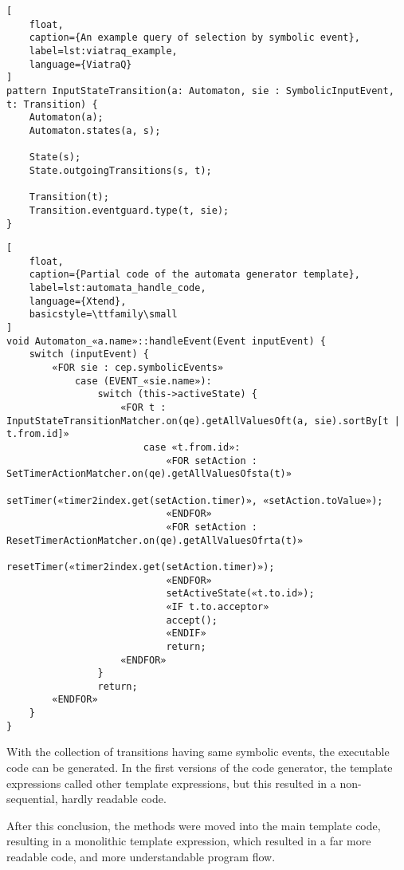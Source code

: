 \begin{lstlisting}[
	float,
	caption={An example query of selection by symbolic event},
	label=lst:viatraq_example,
	language={ViatraQ}
]
pattern InputStateTransition(a: Automaton, sie : SymbolicInputEvent, t: Transition) {
	Automaton(a);
	Automaton.states(a, s);

	State(s);
	State.outgoingTransitions(s, t);

	Transition(t);
	Transition.eventguard.type(t, sie);
}
\end{lstlisting}

\begin{lstlisting}[
	float,
	caption={Partial code of the automata generator template},
	label=lst:automata_handle_code,
	language={Xtend},
	basicstyle=\ttfamily\small
]
void Automaton_«a.name»::handleEvent(Event inputEvent) {
	switch (inputEvent) {
		«FOR sie : cep.symbolicEvents»
			case (EVENT_«sie.name»):
				switch (this->activeState) {
					«FOR t : InputStateTransitionMatcher.on(qe).getAllValuesOft(a, sie).sortBy[t | t.from.id]»
						case «t.from.id»:
							«FOR setAction : SetTimerActionMatcher.on(qe).getAllValuesOfsta(t)»
								setTimer(«timer2index.get(setAction.timer)», «setAction.toValue»);
							«ENDFOR»
							«FOR setAction : ResetTimerActionMatcher.on(qe).getAllValuesOfrta(t)»
								resetTimer(«timer2index.get(setAction.timer)»);
							«ENDFOR»
							setActiveState(«t.to.id»);
							«IF t.to.acceptor»
							accept();
							«ENDIF»
							return;
					«ENDFOR»
				}
				return;
		«ENDFOR»
	}
}
\end{lstlisting}

With the collection of transitions having same symbolic events, the executable \cpp{} code can be generated. In the first versions of the code generator, the template expressions called other template expressions, but this resulted in a non-sequential, hardly readable code.

After this conclusion, the methods were moved into the main template code, resulting in a monolithic template expression, which resulted in a far more readable code, and more understandable program flow.
